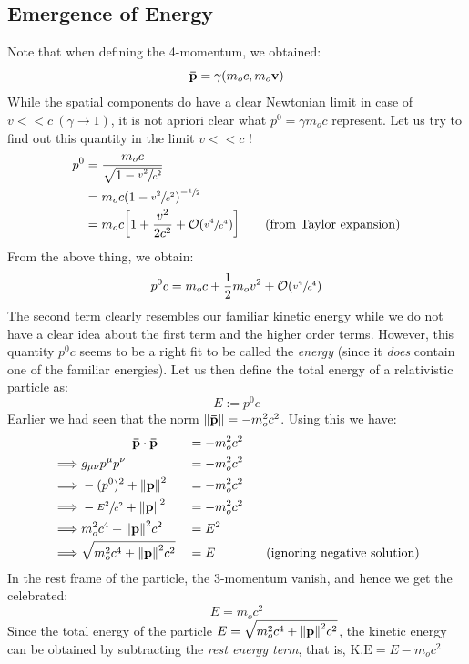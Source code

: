 \subsection{Emergence of Energy}
Note that when defining the 4-momentum, we obtained:
$$\vb{\bar{p}} = \gamma \qty(m_o c, m_o \vb{{v}})$$
While the spatial components do have a clear Newtonian limit in case of $v<< c \ (\gamma\rightarrow 1)$, it is not apriori clear what $p^0 = \gamma m_o c$ represent. Let us try to find out this quantity in the limit $v<<c$ !
\begin{align*}
    p^0 &= \frac{m_o c}{\sqrt{1-\sfrac{v^2}{c^2}}}\\
    &= m_oc \qty(1- \sfrac{v^2}{c^2})^{-\sfrac{1}{2}}\\
    &= m_o c\qty[1 + \frac{v^2}{2c^2}+ \mathcal O\qty(\sfrac{v^4}{c^4})] \qquad (\text{from Taylor expansion})\\
\end{align*}
From the above thing, we obtain:
$$p^0 c = m_o c + \frac{1}{2}m_ov^2 + \mathcal O\qty(\sfrac{v^4}{c^4})$$
The second term clearly resembles our familiar kinetic energy while we do not have a clear idea about the first term and the higher order terms. However, this quantity $p^0 c$ seems to be a right fit to be called the \textit{energy} (since it \textit{does} contain one of the familiar energies). Let us then define the total energy of a relativistic particle as:
$$E:= p^0c$$
Earlier we had seen that the norm $\norm{\vb{\bar{p}}} = - m_o^2 c^2$. Using this we have:
\begin{alignat*}{3}
   &\qquad\qquad \vb{\bar{p}}\cdot\vb{\bar{p}}&&=-m_o^2c^2\\
    \implies& g_{\mu\nu} p^\mu p^\nu &&= -m_o^2c^2\\
    \implies & -(p^0)^2 + \norm{ \vb{{p}}}^2 &&= -m_o^2c^2\\
    \implies & -\sfrac{E^2}{c^2} +\norm{ \vb{{p}}}^2 &&= -m_o^2c^2\\
    \implies & m_o^2c^4 + \norm{ \vb{{p}}}^2 c^2 &&=  E^2  \\
    \implies &\sqrt{m_o^2c^4 + \norm{ \vb{{p}}}^2 c^2} &&=E  \qquad\qquad (\text{ignoring negative solution})
\end{alignat*}
In the rest frame of the particle, the 3-momentum vanish, and hence we get the celebrated: 
$$E = m_oc^2$$
Since the total energy of the particle $E = \sqrt{m_o^2c^4 + \norm{ \vb{{p}}}^2 c^2}$, the kinetic energy can be obtained by subtracting the \textit{rest energy term}, that is, $\mathrm{K.E} = E-m_o c^2$
